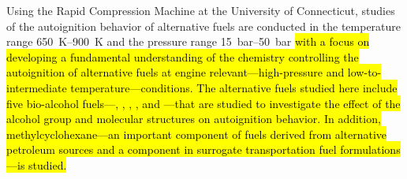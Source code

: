 
% 




% 

Using the Rapid Compression Machine at the University of Connecticut,
studies of the autoignition behavior of alternative fuels are conducted
in the temperature range \SIrange{650}{900}{\kelvin} and the pressure
range \SIrange{15}{50}{\bar} \hl{with a focus
on developing a fundamental understanding of the chemistry controlling
the autoignition of alternative fuels at engine relevant---high-pressure and low-to-intermediate
temperature---conditions. The alternative fuels
studied here include five bio-alcohol fuels---\nBuOH{}, \sBuOH{}, \tBuOH{},
\iBuOH{}, and \iPeOH{}---that are studied to investigate the effect of
the alcohol group and molecular structures on autoignition behavior. In
addition, methylcyclohexane---an important component of fuels derived from
alternative petroleum sources and a component in surrogate transportation fuel
formulations---is studied.}

